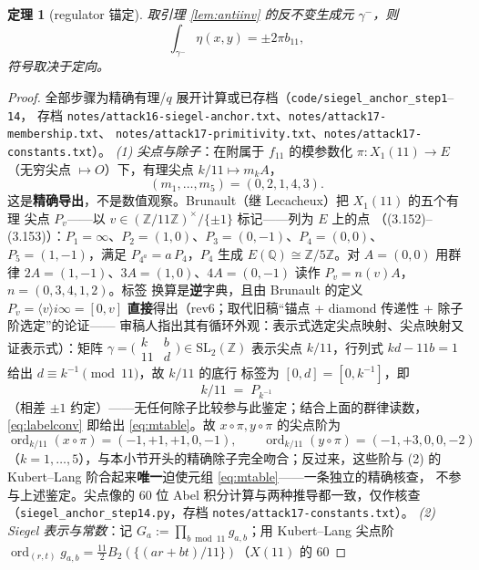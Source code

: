 \documentclass[11pt,a4paper]{ctexart}
\newtheorem{theorem}{定理}
\theoremstyle{remark}
\newcommand{\QQ}{\mathbb{Q}}
\newcommand{\ZZ}{\mathbb{Z}}
\newcommand{\bN}{b_{11}}
\begin{document}
\begin{theorem}[regulator 锚定]\label{thm:anchor}
取引理 \ref{lem:antiinv} 的反不变生成元 $\gamma^-$，则
\[
\int_{\gamma^-}\eta(x,y)=\pm2\pi\bN,\tag{A}\label{eq:anchor}
\]
符号取决于定向。
\end{theorem}

\begin{proof}
全部步骤为精确有理/$q$ 展开计算或已存档（\texttt{code/siegel\_anchor\_step1}--\texttt{14}，
存档 \texttt{notes/attack16-siegel-anchor.txt}、\texttt{notes/attack17-membership.txt}、
\texttt{notes/attack17-primitivity.txt}、\texttt{notes/attack17-constants.txt}）。
\emph{(1) 尖点与除子}：在附属于 $f_{11}$ 的模参数化 $\pi\colon X_1(11)\to E$（无穷尖点
$\mapsto O$）下，有理尖点 $k/11\mapsto m_kA$，
\[
(m_1,\dots,m_5)=(0,2,1,4,3).\tag{M}\label{eq:mtable}
\]
这是\textbf{精确导出}，不是数值观察。Brunault（继 Lecacheux）把 $X_1(11)$ 的五个有理
尖点 $P_v$——以 $v\in(\ZZ/11\ZZ)^\times/\{\pm1\}$ 标记——列为 $E$ 上的点
（(3.152)--(3.153)）：$P_1=\infty$、$P_2=(1,0)$、$P_3=(0,-1)$、$P_4=(0,0)$、
$P_5=(1,-1)$，满足 $P_{4^a}=a\,P_4$，$P_4$ 生成 $E(\QQ)\cong\ZZ/5\ZZ$。对 $A=(0,0)$
用群律 $2A=(1,-1)$、$3A=(1,0)$、$4A=(0,-1)$ 读作 $P_v=n(v)A$，$n=(0,3,4,1,2)$。标签
换算是\textbf{逆}字典，且由 Brunault 的定义 $P_v=\langle v\rangle i\infty=[0,v]$
\textbf{直接}得出（rev6；取代旧稿``锚点 + diamond 传递性 + 除子阶选定''的论证——
审稿人指出其有循环外观：表示式选定尖点映射、尖点映射又证表示式）：矩阵
$\gamma=\bigl(\begin{smallmatrix}k&b\\11&d\end{smallmatrix}\bigr)\in\mathrm{SL}_2(\ZZ)$
表示尖点 $k/11$，行列式 $kd-11b=1$ 给出 $d\equiv k^{-1}\pmod{11}$，故 $k/11$ 的底行
标签为 $[0,d]=[0,k^{-1}]$，即
\[
k/11\;=\;P_{k^{-1}}\tag{L}\label{eq:labelconv}
\]
（相差 $\pm1$ 约定）——无任何除子比较参与此鉴定；结合上面的群律读数，
\eqref{eq:labelconv} 即给出 \eqref{eq:mtable}。故 $x\circ\pi,y\circ\pi$ 的尖点阶为
\[
\operatorname{ord}_{k/11}(x\circ\pi)=(-1,+1,+1,0,-1),\qquad
\operatorname{ord}_{k/11}(y\circ\pi)=(-1,+3,0,0,-2)
\]
（$k=1,\dots,5$），与本小节开头的精确除子完全吻合；反过来，这些阶与 (2) 的
Kubert--Lang 阶合起来\textbf{唯一}迫使元组 \eqref{eq:mtable}——一条独立的精确核查，
不参与上述鉴定。尖点像的 $60$ 位 Abel 积分计算与两种推导都一致，仅作核查
（\texttt{siegel\_anchor\_step14.py}，存档 \texttt{notes/attack17-constants.txt}）。
\emph{(2) Siegel 表示与常数}：记 $G_a:=\prod_{b\bmod 11}g_{a,b}$；用 Kubert--Lang 尖点阶
$\operatorname{ord}_{(r,t)}g_{a,b}=\tfrac{11}{2}B_2(\{(ar+bt)/11\})$（$X(11)$ 的 $60$

\end{proof}
\end{document}
